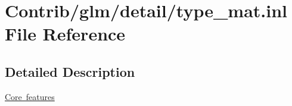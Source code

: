 \hypertarget{type__mat_8inl}{}\section{Contrib/glm/detail/type\+\_\+mat.inl File Reference}
\label{type__mat_8inl}


\subsection{Detailed Description}
\mbox{\hyperlink{group__core}{Core features}} 